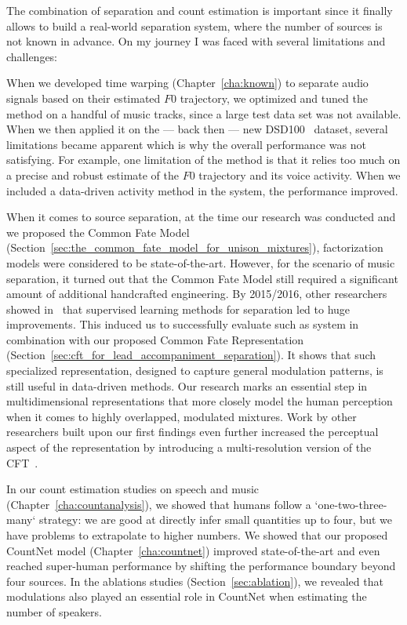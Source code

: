 The combination of separation and count estimation is important since it finally allows to build a real-world separation system, where the number of sources is not known in advance.
On my journey I was faced with several limitations and challenges:
\par
When we developed time warping (Chapter~\ref{cha:known}) to separate audio signals based on their estimated \(F0\) trajectory, we optimized and tuned the method on a handful of music tracks, since a large test data set was not available. When we then applied it on the --- back then --- new DSD100~\cite{liutkus17} dataset, several limitations became apparent which is why the overall performance was not satisfying. For example, one limitation of the method is that it relies too much on a precise and robust estimate of the \(F0\) trajectory and its voice activity. When we included a data-driven activity method in the system, the performance improved.
\par
When it comes to source separation, at the time our research was conducted and we proposed the Common Fate Model (Section~\ref{sec:the_common_fate_model_for_unison_mixtures}), factorization models were considered to be state-of-the-art.
However, for the scenario of music separation, it turned out that the Common Fate Model still required a significant amount of additional handcrafted engineering.
By 2015/2016, other researchers showed in~\cite{uhlich15, nugraha162} that supervised learning methods for separation led to huge improvements. This induced us to successfully evaluate such as system in combination with our proposed Common Fate Representation (Section~\ref{sec:cft_for_lead_accompaniment_separation}).
It shows that such specialized representation, designed to capture general modulation patterns, is still useful in data-driven methods.
Our research marks an essential step in multidimensional representations that more closely model the human perception when it comes to highly overlapped, modulated mixtures. Work by other researchers built upon our first findings even further increased the perceptual aspect of the representation by introducing a multi-resolution version of the CFT~\cite{seetharaman17, pishdadian18}.
\par
In our count estimation studies on speech and music (Chapter~\ref{cha:countanalysis}), we showed that humans follow a `one-two-three-many` strategy: we are good at directly infer small quantities up to four, but we have problems to extrapolate to higher numbers.
We showed that our proposed CountNet model (Chapter~\ref{cha:countnet}) improved state-of-the-art and even reached super-human performance by shifting the performance boundary beyond four sources. In the ablations studies (Section~\ref{sec:ablation}), we revealed that modulations also played an essential role in CountNet when estimating the number of speakers.
